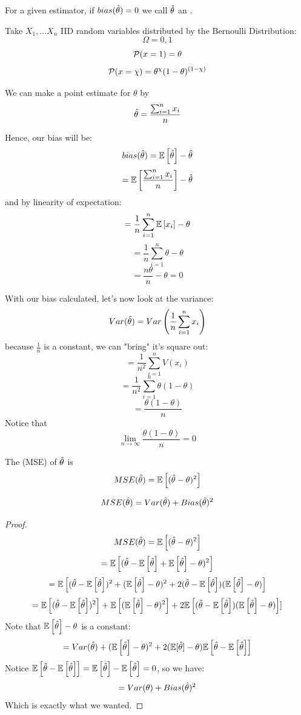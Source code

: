 \begin{definition}
    For a given estimator, if $bias(\thetahat) = 0$ we call $\thetahat$ an .
\end{definition}

\begin{example}
    Take $X_{1}, \ldots X_{n}$ IID random variables distributed by the Bernoulli Distribution:
    \[\Omega = {0, 1} \]
    \[\CP(x = 1) = \theta \]
    \[\CP(x = \chi) = \theta^{\chi}(1 - \theta)^{(1 - \chi)} \]
    
    We can make a point estimate for $\theta$ by
    \[\thetahat = \frac{\sum_{i=1}^{n} x_{i}}{n}\]
    
    Hence, our bias will be:
    \[bias(\thetahat) = \Ev\left[\thetahat\right] - \thetahat  \]
    \[= \Ev\left[ \frac{\sum_{i=1}^{n} x_{i}}{n} \right] - \thetahat\]
    and by linearity of expectation:
    \[= \frac{1}{n} \sum_{i=1}^{n} \Ev \left[x_{i}\right] - \theta \]
    \[= \frac{1}{n} \sum_{i=1}^{n} \theta - \theta \]
    \[= \frac{n\theta}{n} - \theta = 0 \]
    
    With our bias calculated, let's now look at the variance:
    \[Var(\thetahat) = Var\left( \frac{1}{n} \sum_{i=1}^{n} x_{i} \right) \]
    because $\frac{1}{n}$ is a constant, we can "bring" it's square out:
    \[= \frac{1}{n^{2}} \sum_{i=1}^{n} V(x_{i}) \]
    \[= \frac{1}{n^{2}} \sum_{i=1}^{n} \theta(1-\theta) \]
    \[= \frac{\theta(1-\theta)}{n} \]
    Notice that
    \[\lim_{n \to \infty}\frac{\theta(1-\theta)}{n} = 0 \]
    
\begin{definition}
    The  (MSE) of $\thetahat$ is
    \[MSE(\thetahat) = \Ev \left[(\thetahat - \theta)^{2} \right] \]
\end{definition}
    
\begin{lemma}
    \[MSE(\thetahat) = Var(\thetahat) + Bias(\thetahat)^{2} \]
\end{lemma}
    \begin{proof}
    \[ MSE(\thetahat) = \Ev \left[ (\thetahat - \theta)^{2} \right] \]
    \[ = \Ev \left[ (\thetahat - \Ev\left[ \thetahat \right] + \Ev\left[ \thetahat \right] - \theta)^{2}\right] \]
    \[ = \Ev \left[ (\thetahat - \Ev\left[\thetahat\right])^{2} + (\Ev\left[\thetahat\right] - \theta)^{2} + 2(\thetahat - \Ev\left[\thetahat\right])(\Ev\left[\thetahat\right] - \theta) \right] \]
    \[ = \Ev\left[ (\thetahat - \Ev\left[\thetahat\right])^{2} \right] + \Ev\left[ (\Ev \left[ \thetahat \right] - \theta)^{2} \right] + 2\Ev\left[ (\thetahat - \Ev\left[ \thetahat\right])(\Ev\left[\thetahat\right] - \theta) \right]] \]
    Note that $\Ev \left[ \thetahat \right] - \theta$ is a constant:
    \[ = Var(\thetahat) + (\Ev\left[\thetahat\right] - \theta)^{2} + 2(\Ev[\thetahat] - \theta)\Ev\left[ \thetahat - \Ev\left[\thetahat\right] \right]\]
    Notice $\Ev\left[ \thetahat - \Ev\left[\thetahat\right] \right] = \Ev\left[\thetahat\right] - \Ev\left[\thetahat\right] = 0$, so we have:
    \[= Var(\theta) + Bias(\thetahat)^{2} \]
    Which is exactly what we wanted.
    \end{proof}
    
\end{example}

